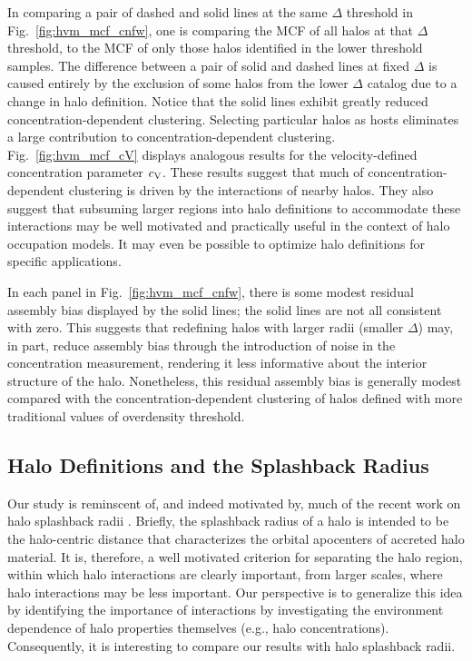 \documentclass[usenatbib,fleqn]{mnras}
\begin{document}
In comparing a pair of dashed and solid lines at the same $\Delta$ threshold in Fig.~\ref{fig:hvm_mcf_cnfw}, one is comparing the MCF of all halos at that $\Delta$ threshold, to the MCF of only those halos identified in the lower threshold samples. The difference between a pair of solid and dashed lines at fixed $\Delta$ is caused entirely by the exclusion of some halos from the lower $\Delta$ catalog due to a change in halo definition. Notice that the solid lines exhibit greatly reduced concentration-dependent clustering. Selecting particular halos as hosts eliminates a large contribution to concentration-dependent clustering. Fig.~\ref{fig:hvm_mcf_cV} displays analogous results for the velocity-defined concentration parameter $c_{\rm V}$. These results suggest that much of concentration-dependent clustering is driven by the interactions of nearby halos. They also suggest that subsuming larger regions into halo definitions to accommodate these interactions may be well motivated and practically useful in the context of halo occupation models. It may even be possible to optimize halo definitions for specific applications. 

In each panel in Fig.~\ref{fig:hvm_mcf_cnfw}, there is some modest residual assembly bias displayed by the solid lines; the solid lines are not all consistent with zero. This suggests that redefining halos with larger radii (smaller $\Delta$) may, in part, reduce assembly bias through the introduction of noise in the concentration measurement, rendering it less informative about the interior structure of the halo. Nonetheless, this residual assembly bias is generally modest compared with the concentration-dependent clustering of halos defined with more traditional values of overdensity threshold.

\subsection{Halo Definitions and the Splashback Radius}

Our study is reminscent of, and indeed motivated by, much of the recent work on halo splashback radii \citep{more_etal15}.  Briefly, the splashback radius of a halo is intended to be the halo-centric distance that characterizes the orbital apocenters of accreted halo material. It is, therefore, a well motivated criterion for separating the halo region, within which halo interactions are clearly important, from larger scales, where halo interactions may be less important. Our perspective is to generalize this idea by identifying the importance of interactions by investigating the environment dependence of halo properties themselves (e.g., halo concentrations). Consequently, it is interesting to compare our results with halo splashback radii. 
\end{document}
